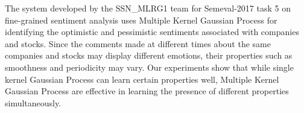 The system developed by the SSN\_MLRG1 team for Semeval-2017 task 5 on fine-grained sentiment analysis uses Multiple Kernel Gaussian Process for identifying the optimistic and pessimistic sentiments associated with companies and stocks. Since the comments made at different times about the same companies and stocks may display different emotions, their properties such as smoothness and periodicity may vary. Our experiments show that while single kernel Gaussian Process can learn certain properties well, Multiple Kernel Gaussian Process are effective in learning the presence of different properties simultaneously.
